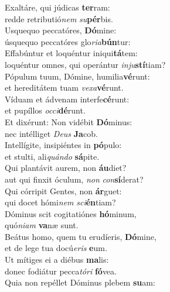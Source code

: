\evenverse Exaltáre, qui júdicas \textbf{ter}ram:~\*\\
\evenverse redde retributió\textit{nem} \textit{su}\textbf{pér}bis.\\
\oddverse Usquequo peccatóres, \textbf{Dó}mine:~\*\\
\oddverse úsquequo peccatóres glo\textit{ri}\textit{a}\textbf{bún}tur:\\
\evenverse Effabúntur et loquéntur iniqui\textbf{tá}tem:~\*\\
\evenverse loquéntur omnes, qui operántur \textit{in}\textit{ju}\textbf{stí}tiam?\\
\oddverse Pópulum tuum, Dómine, humilia\textbf{vé}runt:~\*\\
\oddverse et hereditátem tuam \textit{ve}\textit{xa}\textbf{vé}runt.\\
\evenverse Víduam et ádvenam interfe\textbf{cé}runt:~\*\\
\evenverse et pupíllos \textit{oc}\textit{ci}\textbf{dé}runt.\\
\oddverse Et dixérunt: Non vidébit \textbf{Dó}minus:~\*\\
\oddverse nec intélliget \textit{De}\textit{us} \textbf{Ja}cob.\\
\evenverse Intellígite, insipiéntes in \textbf{pó}pulo:~\*\\
\evenverse et stulti, ali\textit{quán}\textit{do} \textbf{sá}pite.\\
\oddverse Qui plantávit aurem, non \textbf{áu}diet?~\*\\
\oddverse aut qui finxit óculum, \textit{non} \textit{con}\textbf{sí}derat?\\
\evenverse Qui córripit Gentes, non \textbf{ár}guet:~\*\\
\evenverse qui docet hómi\textit{nem} \textit{sci}\textbf{én}tiam?\\
\oddverse Dóminus scit cogitatiónes \textbf{hó}minum,~\*\\
\oddverse quó\textit{ni}\textit{am} \textbf{va}næ sunt.\\
\evenverse Beátus homo, quem tu erudíeris, \textbf{Dó}mine,~\*\\
\evenverse et de lege tua docú\textit{e}\textit{ris} \textbf{e}um.\\
\oddverse Ut mítiges ei a diébus \textbf{ma}lis:~\*\\
\oddverse donec fodiátur pecca\textit{tó}\textit{ri} \textbf{fó}vea.\\
\evenverse Quia non repéllet Dóminus plebem \textbf{su}am:~\*\\
